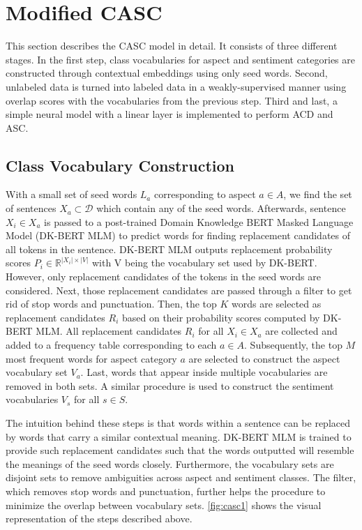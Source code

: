 \documentclass[american, oneside]{ecsgdp}
\begin{document}
\section{Modified CASC} \label{sec:CASC}
This section describes the CASC model in detail. It consists of three different stages. In the first step, class vocabularies for aspect and sentiment categories are constructed through contextual embeddings using only seed words. Second, unlabeled data is turned into labeled data in a weakly-supervised manner using overlap scores with the vocabularies from the previous step. Third and last, a simple neural model with a linear layer is implemented to perform ACD and ASC.

\subsection{Class Vocabulary Construction}
With a small set of seed words $L_a$ corresponding to aspect $a \in A$, we find the set of sentences $X_a \subset \mathcal{D}$ which contain any of the seed words. Afterwards, sentence $X_i \in X_a$ is passed to a post-trained Domain Knowledge BERT Masked Language Model (DK-BERT MLM) to predict words for finding replacement candidates of all tokens in the sentence. DK-BERT MLM outputs replacement probability scores $P_i \in \mathbb{R}^{\lvert X_i \rvert \times \lvert V \rvert}$ with V being the vocabulary set used by DK-BERT. However, only replacement candidates of the tokens in the seed words are considered. Next, those replacement candidates are passed through a filter to get rid of stop words and punctuation. Then, the top $K$ words are selected as replacement candidates $R_i$ based on their probability scores computed by DK-BERT MLM. All replacement candidates $R_i$ for all $X_i \in X_a$ are collected and added to a frequency table corresponding to each $a \in A$. Subsequently, the top $M$ most frequent words for aspect category $a$ are selected to construct the aspect vocabulary set $V_a$. Last, words that appear inside multiple vocabularies are removed in both sets. A similar procedure is used to construct the sentiment vocabularies $V_s$ for all $s \in S$.

The intuition behind these steps is that words within a sentence can be replaced by words that carry a similar contextual meaning. DK-BERT MLM is trained to provide such replacement candidates such that the words outputted will resemble the meanings of the seed words closely. Furthermore, the vocabulary sets are disjoint sets to remove ambiguities across aspect and sentiment classes. The filter, which removes stop words and punctuation, further helps the procedure to minimize the overlap between vocabulary sets. \cref{fig:casc1} shows the visual representation of the steps described above.
\end{document}
